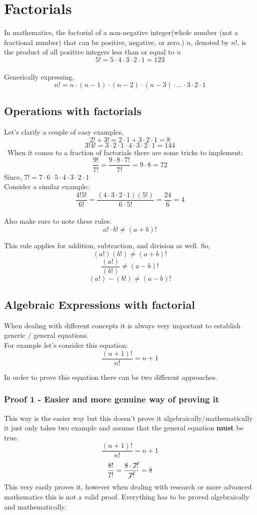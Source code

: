 \section{Factorials}
In mathematics, the factorial of a non-negative integer(whole number (not a fractional number) that can be positive, negative, or zero.) $ n $, denoted by $ n! $, is the product of all positive integers less than or equal to $ n $ \\

$$ 5! = 5 \cdot 4 \cdot 3 \cdot 2 \cdot 1 = 123 $$ \\
Generically expressing, 
$$ n! = n \cdot (n-1) \cdot (n-2) \cdot (n-3) \cdot ... \cdot 3 \cdot 2 \cdot 1 $$

\subsection{Operations with factorials}
Let's clarify a couple of easy examples, 
$$ 2! + 3! = 2 \cdot 1 + 3 \cdot 2 \cdot 1 = 8 $$ 
$$ 3! 4! = 3 \cdot 2 \cdot 1 \cdot 4 \cdot 3 \cdot 2 \cdot 1 = 144 $$ \
When it comes to a fraction of factorials there are some tricks to implement: 
$$ \frac{9!}{7!} = \frac{9 \cdot 8 \cdot 7!}{7!} = 9 \cdot 8 = 72$$
Since, $ 7! = 7 \cdot 6 \cdot 5 \cdot 4 \cdot 3 \cdot 2\cdot 1 $ \\
Consider a similar example: 
$$ \frac{4!5!}{6!} = \frac{(4 \cdot 3 \cdot 2 \cdot 1)(5!)}{6 \cdot 5!} = \frac{24}{6} = 4 $$ \\ 
Also make sure to note these rules:
$$ a! \cdot b! \neq (a + b)! $$ 

This rule applies for addition, subtraction, and division as well. 
So, 
$$ (a!)(b!) \neq (a+b)! $$
$$ \frac{(a!)}{(b!)} \neq (a-b)! $$
$$ (a!) - (b!) \neq (a-b)! $$

\subsection{Algebraic Expressions with factorial}
When dealing with different concepts it is always very important to establish generic / general equations. \\ 
For example let's consider this equation:
$$ \frac{(n+1)!}{n!} = n+1 $$ 

In order to prove this equation there can be two different approaches.
\subsubsection{Proof 1 - Easier and more genuine way of proving it}
This way is the easier way but this doesn’t prove it algebraically/mathematically it just only takes two example and assume that the general equation \textbf{must} be true. 
$$ \frac{(n+1)!}{n!} = n+1 $$
$$ \frac{8!}{7!} = \frac{8 \cdot \cancel{7!}}{\cancel{7!}} = 8 $$
This very easily proves it, however when dealing with research or more advanced mathematics this is not a valid proof. Everything has to be proved algebraically and mathematically.

